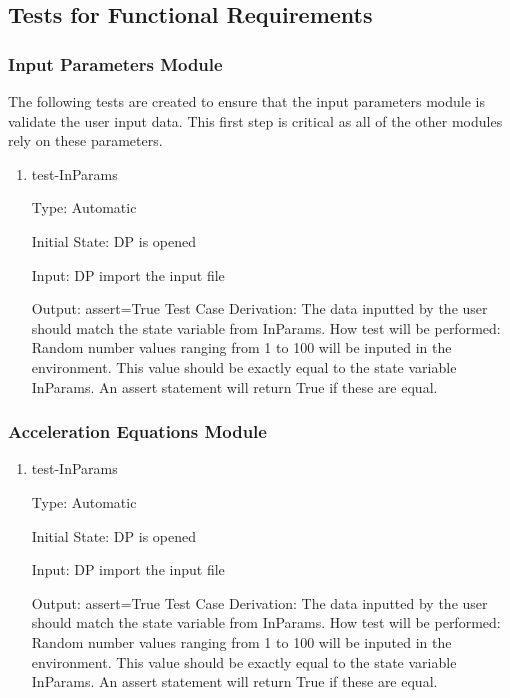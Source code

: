 \documentclass[12pt, titlepage]{article}
\begin{document}
\subsection{Tests for Functional Requirements}

\subsubsection{Input Parameters Module}
The following tests are created to ensure that the input parameters module is validate the user input data. This first step is critical as all of the other modules rely on these parameters.   
 
\begin{enumerate}

\item{test-InParams\\}

Type: Automatic
					
Initial State: DP is opened
					
Input: DP import the input file
					
Output: assert=True
Test Case Derivation: The data inputted by the user should match the state variable from InParams.
How test will be performed: Random number values ranging from 1 to 100 will be inputed in the environment. This value should be exactly equal to the state variable InParams. An assert statement will return True if these are equal. 
					
    
\end{enumerate}

\subsubsection{Acceleration Equations Module}
 
\begin{enumerate}

\item{test-InParams\\}

Type: Automatic
          
Initial State: DP is opened
          
Input: DP import the input file
          
Output: assert=True
Test Case Derivation: The data inputted by the user should match the state variable from InParams.
How test will be performed: Random number values ranging from 1 to 100 will be inputed in the environment. This value should be exactly equal to the state variable InParams. An assert statement will return True if these are equal. 
          
    
\end{enumerate}
\end{document}
